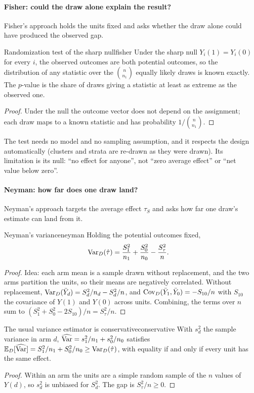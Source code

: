 \documentclass[11pt]{article}
\begin{document}
\paragraph{Fisher: could the draw alone explain the result?} Fisher's approach holds the units fixed and asks
whether the draw alone could have produced the observed gap.
\begin{prop}{Randomization test of the sharp null}{fisher}
Under the sharp null $Y_i(1) = Y_i(0)$ for every $i$, the observed outcomes are both potential outcomes,
so the distribution of any statistic over the $\binom{n}{n_1}$ equally likely draws is known exactly. The
$p$-value is the share of draws giving a statistic at least as extreme as the observed one.
\end{prop}
\begin{proof}
Under the null the outcome vector does not depend on the assignment; each draw maps to a known statistic
and has probability $1/\binom{n}{n_1}$.
\end{proof}
The test needs no model and no sampling assumption, and it respects the design automatically (clusters and
strata are re-drawn as they were drawn). Its limitation is its null: ``no effect for anyone'', not ``zero
average effect'' or ``net value below zero''.

\paragraph{Neyman: how far does one draw land?} Neyman's approach targets the average effect $\tau_S$ and asks
how far one draw's estimate can land from it.
\begin{prop}{Neyman's variance}{neyman}
Holding the potential outcomes fixed,
\[
  \operatorname{Var}_D(\hat{\tau}) = \frac{S_1^2}{n_1} + \frac{S_0^2}{n_0} - \frac{S_\tau^2}{n}.
\]
\end{prop}
\begin{proof}
Idea: each arm mean is a sample drawn without replacement, and the two arms partition the units, so their
means are negatively correlated. Without replacement, $\operatorname{Var}_D(\bar Y_d) = S_d^2/n_d - S_d^2/n$, and
$\operatorname{Cov}_D(\bar Y_1, \bar Y_0) = -S_{10}/n$ with $S_{10}$ the covariance of $Y(1)$ and $Y(0)$ across units.
Combining, the terms over $n$ sum to $(S_1^2 + S_0^2 - 2S_{10})/n = S_\tau^2/n$.
\end{proof}

\begin{prop}{The usual variance estimator is conservative}{conservative}
With $s_d^2$ the sample variance in arm $d$, $\widehat{\operatorname{Var}} = s_1^2/n_1 + s_0^2/n_0$ satisfies
$\mathbb{E}_D[\widehat{\operatorname{Var}}] = S_1^2/n_1 + S_0^2/n_0 \ge \operatorname{Var}_D(\hat{\tau})$, with equality if and only if every unit has
the same effect.
\end{prop}
\begin{proof}
Within an arm the units are a simple random sample of the $n$ values of $Y(d)$, so $s_d^2$ is unbiased for
$S_d^2$. The gap is $S_\tau^2/n \ge 0$.
\end{proof}
\end{document}
